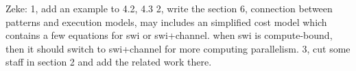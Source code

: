 Zeke:
1, add an example to 4.2, 4.3
2, write the section 6, connection between patterns and execution models, may includes an simplified cost model which contains a few equations for swi or swi+channel.
when swi is compute-bound, then it should switch to swi+channel for more computing parallelism. 
3, cut some staff in section 2 and add the related work there. 